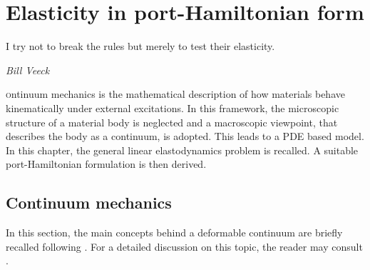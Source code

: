 \chapter{Elasticity in port-Hamiltonian form}

\epigraph{I try not to break the rules but merely to test their elasticity.}{\textit{Bill Veeck}}
\minitoc

\lettrine{\color{theme}{C}}ontinuum mechanics is the mathematical description of how materials behave kinematically under external excitations. In this framework, the microscopic structure of a material body is neglected and a macroscopic viewpoint, that describes the body as a continuum, is adopted. This leads to a PDE based model. In this chapter, the general linear elastodynamics problem is recalled. A suitable port-Hamiltonian formulation is then derived.

\section{Continuum mechanics}
In this section, the main concepts behind a deformable continuum are briefly recalled following \cite{lee2012mixed}. For a detailed discussion on this topic, the reader may consult \cite{abeyaratne2012notes,landau2012elasticity}. 

